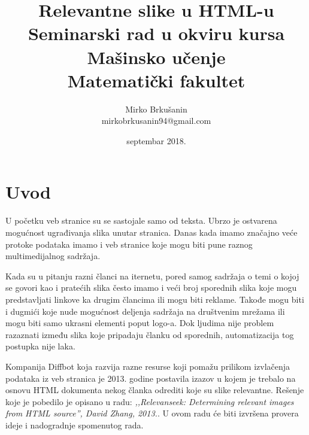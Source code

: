 \documentclass[a4paper]{article}
\begin{document}
\title{Relevantne slike u HTML-u\\ \small{Seminarski rad u okviru kursa\\Mašinsko učenje\\ Matematički fakultet}}

\author{Mirko Brkušanin\\ mirkobrkusanin94@gmail.com}
\date{septembar 2018.}
\maketitle


\tableofcontents

\newpage

\section{Uvod}
\label{sec:uvod}

U početku veb stranice su se sastojale samo od teksta. Ubrzo je ostvarena mogućnost ugrađivanja slika unutar stranica. Danas kada imamo značajno veće protoke podataka imamo i veb stranice koje mogu biti pune raznog multimedijalnog sadržaja. 
	
Kada su u pitanju razni članci na iternetu, pored samog sadržaja o temi o kojoj se govori kao i pratećih slika često imamo i veći broj sporednih slika koje mogu predstavljati linkove ka drugim člancima ili mogu biti reklame. Takođe mogu biti i dugmići koje nude mogućnost deljenja sadržaja na društvenim mrežama ili mogu biti samo ukrasni elementi poput logo-a. Dok ljudima nije problem razaznati između slika koje pripadaju članku od sporednih, automatizacija tog postupka nije laka. 
	
Kompanija Diffbot\cite{diffbot} koja razvija razne resurse koji pomažu prilikom izvlačenja podataka iz veb stranica je 2013. godine postavila izazov u kojem je trebalo na osnovu HTML dokumenta nekog članka odrediti koje su slike relevantne. Rešenje koje je pobedilo je opisano u radu: \textit{,,Relevanseek: Determining relevant images from HTML source'', David Zhang, 2013.}\cite{relevanseek}. U ovom radu će biti izvršena provera ideje i nadogradnje spomenutog rada.
	
\end{document}
